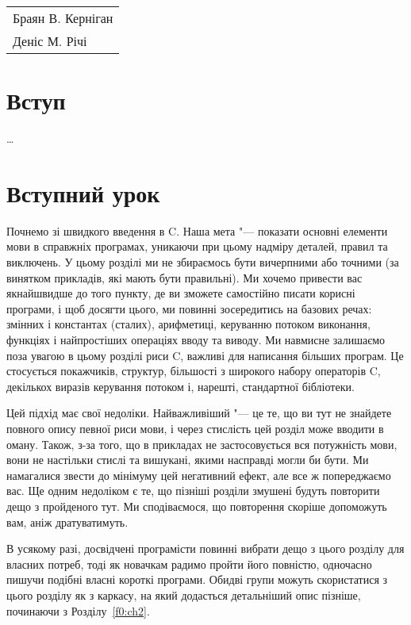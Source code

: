 \documentclass[a4paper,12pt]{book}
\begin{document}
  \hfill
  \begin{tabular}{@{}l@{}}
  Браян В. Керніган\\
  Деніс М. Річі
  \end{tabular}

\mainmatter
\setcounter{secnumdepth}{-1}
\chapter{Вступ}

  \ldots

\setcounter{secnumdepth}{3}
\chapter{Вступний урок}
\label{f0:ch1}

  Почнемо зі швидкого введення в C. Наша мета "--- показати основні елементи мови в
  справжніх програмах, уникаючи при цьому надміру деталей, правил та виключень. У цьому
  розділі ми не збираємось бути вичерпними або точними (за винятком прикладів, які мають
  бути правильні). Ми хочемо привести вас якнайшвидше до того пункту, де ви зможете
  самостійно писати корисні програми, і щоб досягти цього, ми повинні зосередитись на
  базових речах: змінних і константах (сталих), арифметиці, керуванню потоком виконання,
  функціях і найпростіших операціях вводу та виводу. Ми навмисне залишаємо поза увагою в
  цьому розділі риси C, важливі для написання більших програм. Це стосується покажчиків,
  структур, більшості з широкого набору операторів C, декількох виразів керування потоком
  і, нарешті, стандартної бібліотеки.

  Цей підхід має свої недоліки. Найважливіший "--- це те, що ви тут не знайдете повного
  опису певної риси мови, і через стислість цей розділ може вводити в оману. Також, з-за
  того, що в прикладах не застосовується вся потужність мови, вони не настільки стислі та
  вишукані, якими насправді могли би бути. Ми намагалися звести до мінімуму цей
  негативний ефект, але все ж попереджаємо вас. Ще одним недоліком є те, що пізніші
  розділи змушені будуть повторити дещо з пройденого тут. Ми сподіваємося, що повторення
  скоріше допоможуть вам, аніж дратуватимуть.

  В усякому разі, досвідчені програмісти повинні вибрати дещо з цього розділу для
  власних потреб, тоді як новачкам радимо пройти його повністю, одночасно пишучи подібні
  власні короткі програми. Обидві групи можуть скористатися з цього розділу як з каркасу,
  на який додасться детальніший опис пізніше, починаючи з Розділу~\ref{f0:ch2}.
\end{document}
